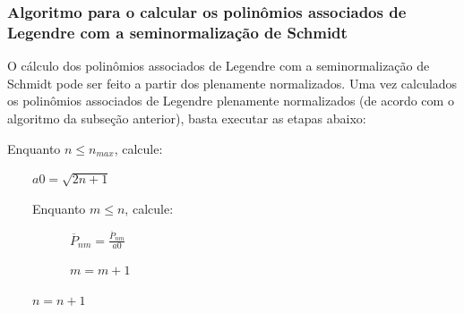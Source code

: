 \documentclass[10pt,a4paper,fleqn]{article}
\begin{document}
\subsubsection{Algoritmo para o calcular os polin\^{o}mios associados de Legendre 
com a seminormaliza\c{c}\~{a}o de Schmidt}

\bigskip

O cálculo dos polinômios associados de Legendre com a seminormalização de Schmidt
pode ser feito a partir dos plenamente normalizados. Uma vez calculados os 
polinômios associados de Legendre plenamente normalizados (de acordo com o algoritmo 
da subseção anterior), basta executar as etapas abaixo:

\bigskip

\begin{minipage}{20em}
	
\begin{flushleft}

%	
%	
%		
%		
%	


Enquanto $n \leq n_{max}$, calcule:

	$\quad\quad a0 = \sqrt{2n + 1}$

	$\quad\quad$Enquanto $m \leq n$, calcule:
	
		$\quad\quad\quad\quad\quad \overline{P}_{nm} = \frac{\overline{P}_{nm}}{a0}$
		
		$\quad\quad\quad\quad\quad m = m + 1$
	
	$\quad\quad n = n + 1$


\end{flushleft}

\end{minipage}
\end{document}
